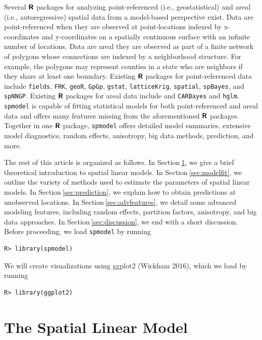 \documentclass{article}
\begin{document}
Several \(\textbf{\textsf{R}}\) packages for analyzing point-referenced
(i.e., geostatistical) and areal (i.e., autoregressive) spatial data
from a model-based perspective exist. Data are point-referenced when
they are observed at point-locations indexed by x-coordinates and
y-coordinates on a spatially continuous surface with an infinite number
of locations. Data are areal they are observed as part of a finite
network of polygons whose connections are indexed by a neighborhood
structure. For example, the polygons may represent counties in a state
who are neighbors if they share at least one boundary. Existing
\(\textbf{\textsf{R}}\) packages for point-referenced data include
\texttt{fields}, \texttt{FRK}, \texttt{geoR}, \texttt{GpGp},
\texttt{gstat}, \texttt{latticeKrig}, \texttt{spatial},
\texttt{spBayes}, and \texttt{spNNGP}. Existing \(\textbf{\textsf{R}}\)
packages for areal data include and \texttt{CARBayes} and \texttt{hglm}.
\texttt{spmodel} is capable of fitting statistical models for both
point-referenced and areal data and offers many features missing from
the aforementioned \(\textbf{\textsf{R}}\) packages. Together in one
\(\textbf{\textsf{R}}\) package, \texttt{spmodel} offers detailed model
summaries, extensive model diagnostics, random effects, anisotropy, big
data methods, prediction, and more.

The rest of this article is organized as follows. In
Section\(~\)\ref{sec:theomodel}, we give a brief theoretical
introduction to spatial linear models. In
Section\(~\)\ref{sec:modelfit}, we outline the variety of methods used
to estimate the parameters of spatial linear models. In
Section\(~\)\ref{sec:prediction}, we explain how to obtain predictions
at unobserved locations. In Section\(~\)\ref{sec:advfeatures}, we detail
some advanced modeling features, including random effects, partition
factors, anisotropy, and big data approaches. In
Section\(~\)\ref{sec:discussion}, we end with a short discussion. Before
proceeding, we load \texttt{spmodel} by running

\begin{verbatim}
R> library(spmodel)
\end{verbatim}

We will create visualizations using ggplot2 (Wickham 2016), which we
load by running

\begin{verbatim}
R> library(ggplot2)
\end{verbatim}

\hypertarget{sec:theomodel}{%
\section{The Spatial Linear Model}\label{sec:theomodel}}
\end{document}
